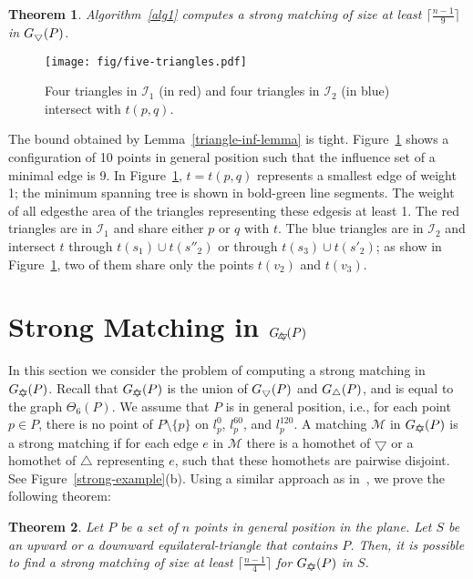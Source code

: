 \documentclass[11pt,a4paper]{article}
\newcommand{\G}[2]{G_{#1}({#2})}
\newcommand{\trid}{\bigtriangledown}
\newcommand{\trids}{\scriptsize\bigtriangledown}
\newcommand{\triu}{\bigtriangleup}
\newcommand{\trius}{\scriptsize\bigtriangleup}
\newcommand{\GUD}{G_{\bigtriangledown \hspace*{-7.5pt} \bigtriangleup}}
\newtheorem{theorem}{Theorem}
\begin{document}
\begin{theorem}
\label{half-theta-six-thr}
Algorithm~\ref{alg1} computes a strong matching of size at least $\lceil\frac{n-1}{9}\rceil$ in $\G{\trids}{P}$.
\end{theorem}

\begin{figure}[htb]
  \centering
\texttt{[image: fig/five-triangles.pdf]}
  \caption{Four triangles in $\mathcal{I}_1$ (in red) and four triangles in $\mathcal{I}_2$ (in blue) intersect with $t(p,q)$.}
\label{five-fig}
\end{figure}

The bound obtained by Lemma~\ref{triangle-inf-lemma} is tight. Figure~\ref{five-fig} shows a configuration of 10 points in general position such that the influence set of a minimal edge is 9. In Figure~\ref{five-fig}, $t=t(p,q)$ represents a smallest edge of weight 1; the minimum spanning tree is shown in bold-green line segments. The weight of all edges\textemdash the area of the triangles representing these edges\textemdash is at least 1. The red triangles are in $\mathcal{I}_1$ and share either $p$ or $q$ with $t$. The blue triangles are in $\mathcal{I}_2$ and intersect $t$ through $t(s_1)\cup t(s''_2)$ or through $t(s_3)\cup t(s'_2)$; as show in Figure~\ref{five-fig}, two of them share only the points $t(v_2)$ and $t(v_3)$.

\section{Strong Matching in $G_{\bigtriangledown \hspace*{-8.7pt} \bigtriangleup}(P)$}

In this section we consider the problem of computing a strong matching in $\GUD(P)$. Recall that $\GUD(P)$ is the union of $\G{\trids}{P}$ and $\G{\trius}{P}$, and is equal to the graph $\Theta_6(P)$. We assume that $P$ is in general position, i.e., for each point $p\in P$, there is no point of $P\setminus \{p\}$ on $l_p^0$, $l_p^{60}$, and $l_p^{120}$. A matching $\mathcal{M}$ in $\GUD(P)$ is a strong matching if for each edge $e$ in $\mathcal{M}$ there is a homothet of $\trid$ or a homothet of $\triu$ representing $e$, such that these homothets are pairwise disjoint. See Figure~\ref{strong-example}(b). Using a similar approach as in~\cite{Abrego2009}, we prove the following theorem:

\label{theta-six-section}
\begin{theorem}
\label{theta-six-thr}
Let $P$ be a set of $n$ points in general position in the plane. Let $S$ be an upward or a downward equilateral-triangle that contains $P$. Then, it is possible to find a strong matching of size at least $\lceil\frac{n-1}{4}\rceil$ for $\GUD(P)$ in $S$.
\end{theorem}
\end{document}
